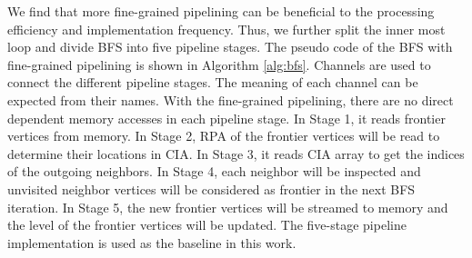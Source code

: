 We find that more fine-grained pipelining can be beneficial to the processing 
efficiency and implementation frequency. Thus, we further split the 
inner most loop and divide BFS into five pipeline stages. 
The pseudo code of the BFS with fine-grained pipelining 
is shown in Algorithm \ref{alg:bfs}. Channels are used to connect the different 
pipeline stages. The meaning of each channel can be expected from their names. 
With the fine-grained pipelining, there are no direct dependent memory 
accesses in each pipeline stage. In Stage 1, it reads frontier 
vertices from memory. In Stage 2, 
RPA of the frontier vertices will be read to determine their locations in CIA. 
In Stage 3, it reads CIA array to get the indices of the outgoing 
neighbors. In Stage 4, each neighbor will be inspected and 
unvisited neighbor vertices will be considered as frontier 
in the next BFS iteration. In Stage 5, the new frontier 
vertices will be streamed to memory and the level of 
the frontier vertices will be updated. The five-stage pipeline 
implementation is used as the baseline in this work. 

